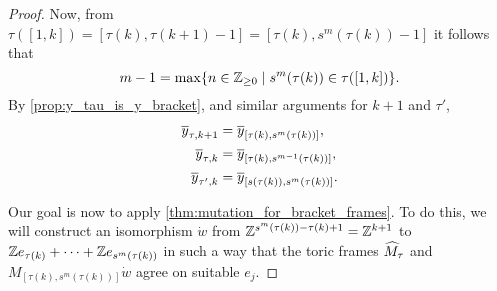 \begin{proof}
	Now, from $\tau([1, k]) = [\tau(k), \tau(k+1) - 1] = [\tau(k), s^m(\tau(k)) - 1]$ it
	follows that
	\begin{equation*}
		m - 1 = \max\{n \in \mathbb{Z}_{\geq 0} \mid s^m(\tau(k)) \in \tau([1, k])\}.
	\end{equation*}
	By \cref{prop:y_tau_is_y_bracket}, and similar arguments for $k+1$ and $\tau'$,
	\begin{align*}
		\overline{y}_{\tau, k+1} & = \overline{y}_{[\tau(k), s^m(\tau(k))]},     \\
		\overline{y}_{\tau, k}   & = \overline{y}_{[\tau(k), s^{m-1}(\tau(k))]}, \\
		\overline{y}_{\tau', k}  & = \overline{y}_{[s(\tau(k)), s^m(\tau(k))]}.
	\end{align*}

	Our goal is now to apply \cref{thm:mutation_for_bracket_frames}. To do this, we will
	construct an isomorphism $\dot{w}$ from $\mathbb{Z}^{s^m(\tau(k)) -\tau(k) + 1} = \mathbb{Z}^{k+1}$
	to $\mathbb{Z} e_{\tau(k)} + \cdots + \mathbb{Z} e_{s^m(\tau(k))}$ in such a way that the toric
	frames $\widehat{M}_\tau$ and $M_{[\tau(k), s^m(\tau(k))]}\dot{w}$ agree on suitable $e_j$.


\end{proof}
